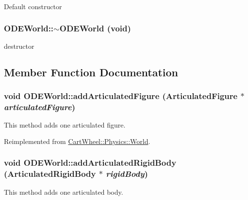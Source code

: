 Default constructor \hypertarget{classCartWheel_1_1Physics_1_1ODEWorld_a613783ade6a491ef6544227e1b484594}{
\subsubsection[{$\sim$ODEWorld}]{\setlength{\rightskip}{0pt plus 5cm}ODEWorld::$\sim$ODEWorld (void)}}
\label{classCartWheel_1_1Physics_1_1ODEWorld_a613783ade6a491ef6544227e1b484594}
destructor 

\subsection{Member Function Documentation}
\hypertarget{classCartWheel_1_1Physics_1_1ODEWorld_a092b6f5911b2241c63927005b71fdf1d}{
\subsubsection[{addArticulatedFigure}]{\setlength{\rightskip}{0pt plus 5cm}void ODEWorld::addArticulatedFigure ({\bf ArticulatedFigure} $\ast$ {\em articulatedFigure})}}
\label{classCartWheel_1_1Physics_1_1ODEWorld_a092b6f5911b2241c63927005b71fdf1d}
This method adds one articulated figure. 

Reimplemented from \hyperlink{classCartWheel_1_1Physics_1_1World_af98e74c3270d1d55dc0990be78653214}{CartWheel::Physics::World}.

\hypertarget{classCartWheel_1_1Physics_1_1ODEWorld_aa68b2283efade199c6d444672afea1eb}{
\subsubsection[{addArticulatedRigidBody}]{\setlength{\rightskip}{0pt plus 5cm}void ODEWorld::addArticulatedRigidBody ({\bf ArticulatedRigidBody} $\ast$ {\em rigidBody})}}
\label{classCartWheel_1_1Physics_1_1ODEWorld_aa68b2283efade199c6d444672afea1eb}
This method adds one articulated body.


